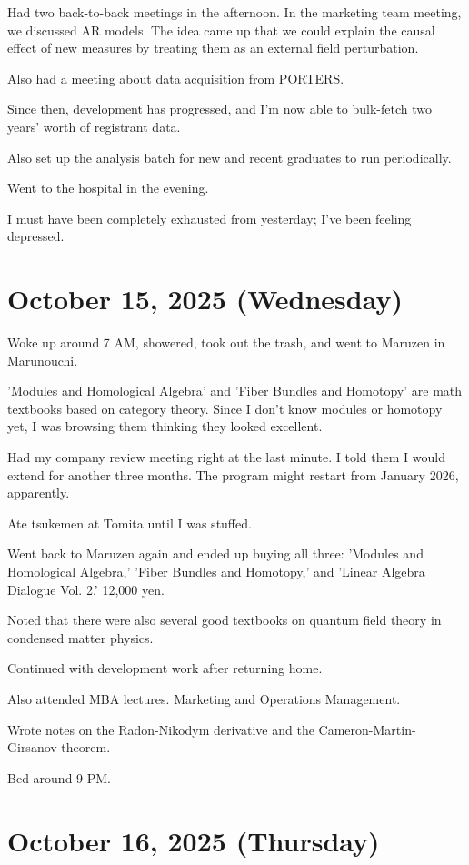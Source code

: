 \documentclass{article}
\begin{document}
Had two back-to-back meetings in the afternoon.
In the marketing team meeting, we discussed AR models.
The idea came up that we could explain the causal effect of new measures by treating them as an external field perturbation.

Also had a meeting about data acquisition from PORTERS.

Since then, development has progressed, and I'm now able to bulk-fetch two years' worth of registrant data.

Also set up the analysis batch for new and recent graduates to run periodically.

Went to the hospital in the evening.

I must have been completely exhausted from yesterday; I've been feeling depressed.

\section{October 15, 2025 (Wednesday)}

Woke up around 7 AM, showered, took out the trash, and went to Maruzen in Marunouchi.

'Modules and Homological Algebra' and 'Fiber Bundles and Homotopy' are math textbooks based on category theory. Since I don't know modules or homotopy yet, I was browsing them thinking they looked excellent.

Had my company review meeting right at the last minute.
I told them I would extend for another three months.
The program might restart from January 2026, apparently.

Ate tsukemen at Tomita until I was stuffed.

Went back to Maruzen again and ended up buying all three: 'Modules and Homological Algebra,' 'Fiber Bundles and Homotopy,' and 'Linear Algebra Dialogue Vol. 2.'
12,000 yen.

Noted that there were also several good textbooks on quantum field theory in condensed matter physics.

Continued with development work after returning home.

Also attended MBA lectures.
Marketing and Operations Management.

Wrote notes on the Radon-Nikodym derivative and the Cameron-Martin-Girsanov theorem.

Bed around 9 PM.

\section{October 16, 2025 (Thursday)}
\end{document}
